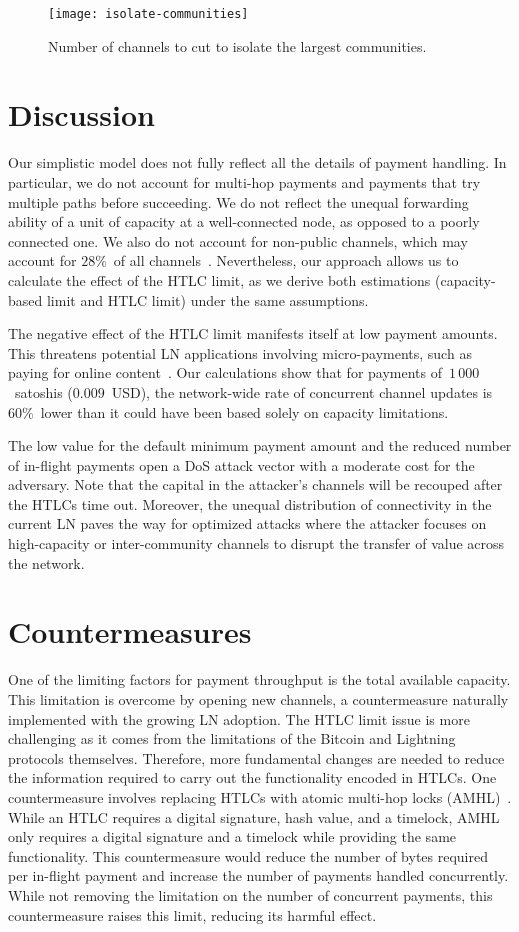 \begin{figure}[tb]
	\centering
	\texttt{[image: isolate-communities]}
	\caption{Number of channels to cut to isolate the largest communities.}
	\label{fig:isolate-communities}
\end{figure}


\section{Discussion}
Our simplistic model does not fully reflect all the details of payment handling.
In particular, we do not account for multi-hop payments and payments that try multiple paths before succeeding.
We do not reflect the unequal forwarding ability of a unit of capacity at a well-connected node, as opposed to a poorly connected one.
We also do not account for non-public channels, which may account for $28\%$~of all channels~\cite{BitMEXPrivateChannels}.
Nevertheless, our approach allows us to calculate the effect of the HTLC limit, as we derive both estimations (capacity-based limit and HTLC limit)  under the same assumptions.

The negative effect of the HTLC limit manifests itself at low payment amounts.
This threatens potential LN applications involving micro-payments, such as paying for online content~\cite{Poon2016}.
Our calculations show that for payments of~$1\,000$~satoshis ($0.009$~USD), the network-wide rate of concurrent channel updates is $60\%$~lower than it could have been based solely on capacity limitations.

The low value for the default minimum payment amount and the reduced number of in-flight payments open a DoS attack vector with a moderate cost for the adversary.
Note that the capital in the attacker's channels will be recouped after the HTLCs time out.
Moreover, the unequal distribution of connectivity in the current LN paves the way for optimized attacks where the attacker focuses on high-capacity or inter-community channels to disrupt the transfer of value across the network.


\section{Countermeasures}
One of the limiting factors for payment throughput is the total available capacity.
This limitation is overcome by opening new channels, a countermeasure naturally implemented with the growing LN adoption.
The HTLC limit issue is more challenging as it comes from the limitations of the Bitcoin and Lightning protocols themselves.
Therefore, more fundamental changes are needed to reduce the information required to carry out the functionality encoded in HTLCs.
One countermeasure involves replacing HTLCs with atomic multi-hop locks (AMHL)~\cite{Malavolta2019}.
While an HTLC requires a digital signature, hash value, and a timelock, AMHL only requires a digital signature and a timelock while providing the same functionality.
This countermeasure would reduce the number of bytes required per in-flight payment and increase the number of payments handled concurrently.
While not removing the limitation on the number of concurrent payments, this countermeasure raises this limit, reducing its harmful effect.


